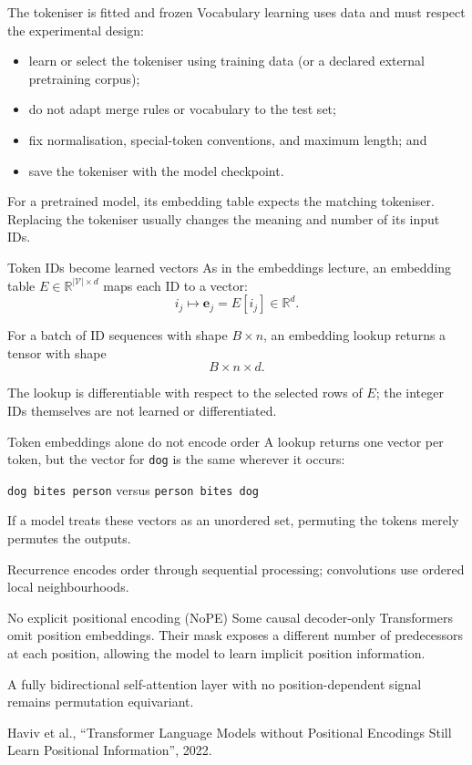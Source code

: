 \begin{frame}{The tokeniser is fitted and frozen}
  Vocabulary learning uses data and must respect the experimental design:
  \begin{itemize}
    \item learn or select the tokeniser using training data (or a declared
      external pretraining corpus);
    \item do not adapt merge rules or vocabulary to the test set;
    \item fix normalisation, special-token conventions, and maximum length; and
    \item save the tokeniser with the model checkpoint.
  \end{itemize}

  For a pretrained model, its embedding table expects the matching tokeniser.
  Replacing the tokeniser usually changes the meaning and number of its input IDs.
\end{frame}

\begin{frame}{Token IDs become learned vectors}
  As in the embeddings lecture, an embedding table
  $E\in\mathbb{R}^{|\mathcal{V}|\times d}$ maps each ID to a vector:
  \[
    i_j \longmapsto \mathbf{e}_j = E[i_j]\in\mathbb{R}^{d}.
  \]

  For a batch of ID sequences with shape $B\times n$, an embedding lookup returns
  a tensor with shape
  \[
    B\times n\times d.
  \]

  The lookup is differentiable with respect to the selected rows of $E$; the
  integer IDs themselves are not learned or differentiated.
\end{frame}

\begin{frame}{Token embeddings alone do not encode order}
  A lookup returns one vector per token, but the vector for \texttt{dog} is the
  same wherever it occurs:
  \begin{center}
    \texttt{dog bites person}
    \qquad versus\qquad
    \texttt{person bites dog}
  \end{center}

  If a model treats these vectors as an unordered set, permuting the tokens
  merely permutes the outputs.

  Recurrence encodes order through sequential processing; convolutions use
  ordered local neighbourhoods.

  \begin{block}{No explicit positional encoding (NoPE)}
    Some causal decoder-only Transformers omit position embeddings. Their mask
    exposes a different number of predecessors at each position, allowing the
    model to learn implicit position information.
  \end{block}

  A fully bidirectional self-attention layer with no position-dependent signal
  remains permutation equivariant.

  \vfill
  {\tiny Haviv et al., ``Transformer Language Models without Positional
  Encodings Still Learn Positional Information'', 2022.}
\end{frame}

